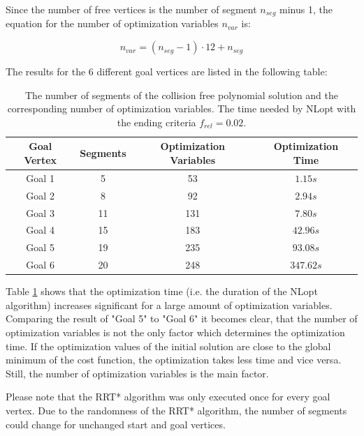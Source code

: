 Since the number of free vertices is the number of segment $n_{seg}$ minus 1, the equation for the number of optimization variables $n_{var}$ is:

\begin{equation}
n_{var} = (n_{seg} - 1)\cdot 12 + n_{seg}
\label{equ:numberOfSeg}
\end{equation}

The results for the 6 different goal vertices are listed in the following table:


\begin{table}[H] 
\begin{center}
    \begin{tabular}{| c | c | c | c | }
    \hline
    Goal Vertex & Segments & Optimization Variables & Optimization Time\\ \hline
   Goal 1 & 5 & 53 & $1.15s$\\ \hline
  Goal 2 & 8 & 92 & $2.94s$\\ \hline
   Goal 3 & 11 & 131 & $7.80s$\\ \hline
Goal 4 & 15 & 183& $42.96s$\\ \hline
Goal 5 & 19 & 235& $93.08s$\\ \hline
   Goal 6& 20 & 248 & $347.62s$\\
    \hline
    \end{tabular}
    \caption{The number of segments of the collision free polynomial solution and the corresponding number of optimization variables. The time needed by NLopt with the ending criteria $f_{rel} = 0.02$.}
    \label{tab:MLoptimizationTime}
\end{center}
\end{table}

Table \ref{tab:MLoptimizationTime} shows that the optimization time (i.e. the duration of the NLopt algorithm) increases significant for a large amount of optimization variables. Comparing the result of "Goal 5" to "Goal 6" it becomes clear, that the number of optimization variables is not the only factor which determines the optimization time. If the optimization values of the initial solution are close to the global minimum of the cost function, the optimization takes less time and vice versa. Still, the number of optimization variables is the main factor. \newline

Please note that the RRT* algorithm was only executed once for every goal vertex. Due to the randomness of the RRT* algorithm, the number of segments could change for unchanged start and goal vertices.\newline



